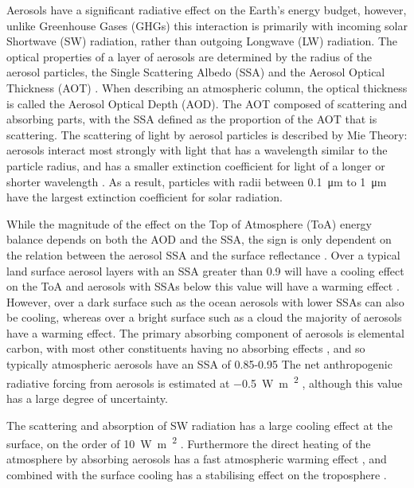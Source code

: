 Aerosols have a significant radiative effect on the Earth's energy budget, however, unlike Greenhouse Gases (GHGs) this interaction is primarily with incoming solar Shortwave (SW) radiation, rather than outgoing Longwave (LW) radiation.
The optical properties of a layer of aerosols are determined by the radius of the aerosol particles, the Single Scattering Albedo (SSA) and the Aerosol Optical Thickness (AOT) \citep{acci}.
When describing an atmospheric column, the optical thickness is called the Aerosol Optical Depth (AOD).
The AOT composed of scattering and absorbing parts, with the SSA defined as the proportion of the AOT that is scattering. 
The scattering of light by aerosol particles is described by Mie Theory: aerosols interact most strongly with light that has a wavelength similar to the particle radius, and has a smaller extinction coefficient for light of a longer or shorter wavelength \citep{acci}. 
As a result, particles with radii between \SI{0.1}{\micro\meter} to \SI{1}{\micro\meter} have the largest extinction coefficient for solar radiation.

While the magnitude of the effect on the Top of Atmosphere (ToA) energy balance depends on both the AOD and the SSA, the sign is only dependent on the relation between the aerosol SSA and the surface reflectance \citep{chylek_aerosols_1974, haywood_effect_1995}.
Over a typical land surface aerosol layers with an SSA greater than 0.9 will have a cooling effect on the ToA and aerosols with SSAs below this value will have a warming effect \citep{ramanathan_aerosols_2001}.
However, over a dark surface such as the ocean aerosols with lower SSAs can also be cooling, whereas over a bright surface such as a cloud the majority of aerosols have a warming effect.
The primary absorbing component of aerosols is elemental carbon, with most other constituents having no absorbing effects \citep{acci}, and so typically atmospheric aerosols have an SSA of 0.85-0.95  \citep{ramanathan_aerosols_2001} 
The net anthropogenic radiative forcing from aerosols is estimated at \SI{-0.5}{\watt\meter\textsuperscript{2}} \citep{IPCCRadiativeForcingMyhre2013}, although this value has a large degree of uncertainty.

The scattering and absorption of SW radiation has a large cooling effect at the surface, on the order of \SI{10}{\watt\meter\textsuperscript{2}} \citep{ramanathan_aerosols_2001}.
Furthermore the direct heating of the atmosphere by absorbing aerosols has a fast atmospheric warming effect \citep{suzuki_perturbations_2019}, and combined with the surface cooling has a stabilising effect on the troposphere \citep{fan_effects_2008, koren_smoke_2008}.

